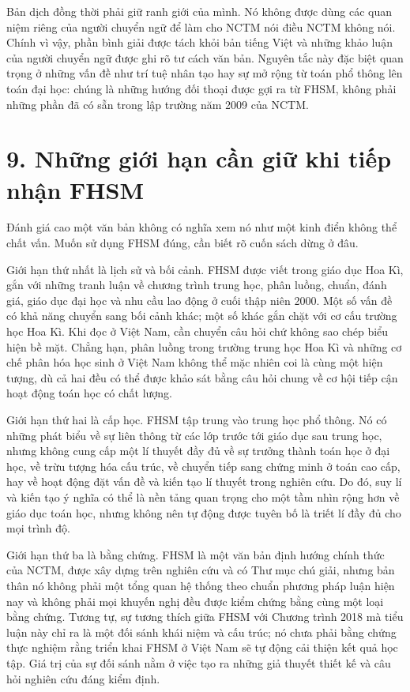 Bản dịch đồng thời phải giữ ranh giới của mình. Nó không được dùng các quan niệm riêng của người chuyển ngữ để làm cho NCTM nói điều NCTM không nói. Chính vì vậy, phần bình giải được tách khỏi bản tiếng Việt và những khảo luận của người chuyển ngữ được ghi rõ tư cách văn bản. Nguyên tắc này đặc biệt quan trọng ở những vấn đề như trí tuệ nhân tạo hay sự mở rộng từ toán phổ thông lên toán đại học: chúng là những hướng đối thoại được gợi ra từ FHSM, không phải những phần đã có sẵn trong lập trường năm 2009 của NCTM.

{}
\section*{9. Những giới hạn cần giữ khi tiếp nhận FHSM}

Đánh giá cao một văn bản không có nghĩa xem nó như một kinh điển không thể chất vấn. Muốn sử dụng FHSM đúng, cần biết rõ cuốn sách dừng ở đâu.

Giới hạn thứ nhất là lịch sử và bối cảnh. FHSM được viết trong giáo dục Hoa Kì, gắn với những tranh luận về chương trình trung học, phân luồng, chuẩn, đánh giá, giáo dục đại học và nhu cầu lao động ở cuối thập niên 2000. Một số vấn đề có khả năng chuyển sang bối cảnh khác; một số khác gắn chặt với cơ cấu trường học Hoa Kì. Khi đọc ở Việt Nam, cần chuyển câu hỏi chứ không sao chép biểu hiện bề mặt. Chẳng hạn, phân luồng trong trường trung học Hoa Kì và những cơ chế phân hóa học sinh ở Việt Nam không thể mặc nhiên coi là cùng một hiện tượng, dù cả hai đều có thể được khảo sát bằng câu hỏi chung về cơ hội tiếp cận hoạt động toán học có chất lượng.

Giới hạn thứ hai là cấp học. FHSM tập trung vào trung học phổ thông. Nó có những phát biểu về sự liên thông từ các lớp trước tới giáo dục sau trung học, nhưng không cung cấp một lí thuyết đầy đủ về sự trưởng thành toán học ở đại học, về trừu tượng hóa cấu trúc, về chuyển tiếp sang chứng minh ở toán cao cấp, hay về hoạt động đặt vấn đề và kiến tạo lí thuyết trong nghiên cứu. Do đó, suy lí và kiến tạo ý nghĩa có thể là nền tảng quan trọng cho một tầm nhìn rộng hơn về giáo dục toán học, nhưng không nên tự động được tuyên bố là triết lí đầy đủ cho mọi trình độ.

Giới hạn thứ ba là bằng chứng. FHSM là một văn bản định hướng chính thức của NCTM, được xây dựng trên nghiên cứu và có Thư mục chú giải, nhưng bản thân nó không phải một tổng quan hệ thống theo chuẩn phương pháp luận hiện nay và không phải mọi khuyến nghị đều được kiểm chứng bằng cùng một loại bằng chứng. Tương tự, sự tương thích giữa FHSM với Chương trình 2018 mà tiểu luận này chỉ ra là một đối sánh khái niệm và cấu trúc; nó chưa phải bằng chứng thực nghiệm rằng triển khai FHSM ở Việt Nam sẽ tự động cải thiện kết quả học tập. Giá trị của sự đối sánh nằm ở việc tạo ra những giả thuyết thiết kế và câu hỏi nghiên cứu đáng kiểm định.

